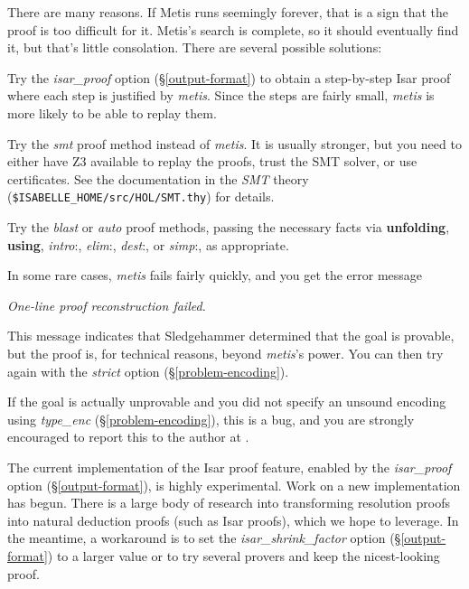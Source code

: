 \documentclass[a4paper,12pt]{article}
\begin{document}

There are many reasons. If Metis runs seemingly forever, that is a sign that the
proof is too difficult for it. Metis's search is complete, so it should
eventually find it, but that's little consolation. There are several possible
solutions:

\begin{enum}
\item[\labelitemi] Try the \textit{isar\_proof} option (\S\ref{output-format}) to
obtain a step-by-step Isar proof where each step is justified by \textit{metis}.
Since the steps are fairly small, \textit{metis} is more likely to be able to
replay them.

\item[\labelitemi] Try the \textit{smt} proof method instead of \textit{metis}. It
is usually stronger, but you need to either have Z3 available to replay the
proofs, trust the SMT solver, or use certificates. See the documentation in the
\emph{SMT} theory (\texttt{\$ISABELLE\_HOME/src/HOL/SMT.thy}) for details.

\item[\labelitemi] Try the \textit{blast} or \textit{auto} proof methods, passing
the necessary facts via \textbf{unfolding}, \textbf{using}, \textit{intro}{:},
\textit{elim}{:}, \textit{dest}{:}, or \textit{simp}{:}, as appropriate.
\end{enum}

In some rare cases, \textit{metis} fails fairly quickly, and you get the error
message

\prew
\slshape
One-line proof reconstruction failed.
\postw

This message indicates that Sledgehammer determined that the goal is provable,
but the proof is, for technical reasons, beyond \textit{metis}'s power. You can
then try again with the \textit{strict} option (\S\ref{problem-encoding}).

If the goal is actually unprovable and you did not specify an unsound encoding
using \textit{type\_enc} (\S\ref{problem-encoding}), this is a bug, and you are
strongly encouraged to report this to the author at \authoremail.


The current implementation of the Isar proof feature,
enabled by the \textit{isar\_proof} option (\S\ref{output-format}),
is highly experimental. Work on a new implementation has begun. There is a large body of
research into transforming resolution proofs into natural deduction proofs (such
as Isar proofs), which we hope to leverage. In the meantime, a workaround is to
set the \textit{isar\_shrink\_factor} option (\S\ref{output-format}) to a larger
value or to try several provers and keep the nicest-looking proof.
\end{document}
